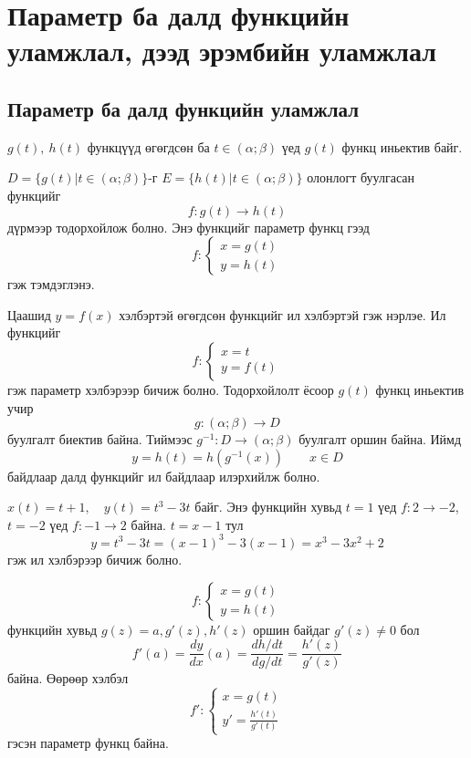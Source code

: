 \chapter{Параметр ба далд функцийн уламжлал, дээд эрэмбийн уламжлал}
\section{Параметр ба далд функцийн уламжлал}
\begin{definition}
 $g(t),\ h(t)$ функцүүд өгөгдсөн ба $t\in(\alpha;\beta)$ үед $g(t)$ функц иньектив  байг.
 
 $D=\{g(t)|t\in(\alpha;\beta)\}$-г  $E=\{h(t)|t\in(\alpha;\beta)\}$ олонлогт буулгасан функцийг 
 $$f: g(t)\to h(t)$$ дүрмээр тодорхойлож болно. Энэ функцийг параметр функц гээд 
 $$ f:
 \begin{cases}
     x=g(t)\\
     y=h(t)
 \end{cases}$$ гэж тэмдэглэнэ. 
\end{definition}
Цаашид $y=f(x)$ хэлбэртэй өгөгдсөн функцийг ил хэлбэртэй гэж нэрлэе. Ил функцийг $$ f:
 \begin{cases}
     x=t\\
     y=f(t)
 \end{cases}$$ гэж параметр хэлбэрээр бичиж болно. Тодорхойлолт ёсоор $g(t)$ функц иньектив учир $$g: (\alpha;\beta)\to D$$ буулгалт биектив байна. Тиймээс $g^{-1}: D\to (\alpha;\beta)$ буулгалт оршин байна. Иймд 
 $$y=h(t)=h(g^{-1}(x))\qquad x\in D$$ байдлаар далд функцийг ил байдлаар илэрхийлж болно.
 \begin{example}
$x(t)=t+1,\quad y(t)=t^3-3t$ байг. Энэ функцийн хувьд $t=1$ үед $f:2\to -2$, $t=-2$ үед $f:-1\to 2$ байна. $t=x-1$ тул 
\[y=t^3-3t=(x-1)^3-3(x-1)=x^3-3x^2+2
\] гэж ил хэлбэрээр бичиж болно.
\end{example}
\begin{theorem} 
$$ f:
 \begin{cases}
     x=g(t)\\
     y=h(t)
 \end{cases}$$ функцийн хувьд 
$g(z)=a, g'(z), h'(z)$ оршин байдаг $g'(z)\neq 0$ бол 
\[
f'(a)=\frac{dy}{dx}(a)=\frac{dh/dt}{dg/dt}=\frac{h'(z)}{g'(z)}
\] байна.
Өөрөөр хэлбэл 
$$ f':
 \begin{cases}
     x=g(t)\\
     y'=\frac{h'(t)}{g'(t)}
 \end{cases}$$ гэсэн параметр функц байна.
\end{theorem}

